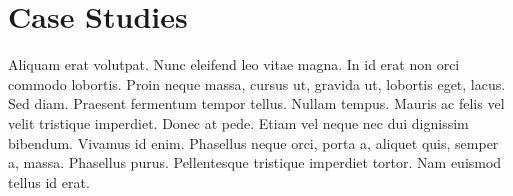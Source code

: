 \section{Case Studies}
\label{sec:casestudies}

Aliquam erat volutpat. Nunc eleifend leo vitae magna. In id erat non orci
commodo lobortis. Proin neque massa, cursus ut, gravida ut, lobortis eget,
lacus. Sed diam. Praesent fermentum tempor tellus. Nullam tempus. Mauris ac
felis vel velit tristique imperdiet. Donec at pede. Etiam vel neque nec dui
dignissim bibendum. Vivamus id enim. Phasellus neque orci, porta a, aliquet
quis, semper a, massa. Phasellus purus. Pellentesque tristique imperdiet tortor.
Nam euismod tellus id erat.
